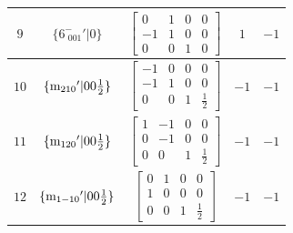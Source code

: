 \documentclass[fleqn,8pt]{jsarticle}
\begin{document}
\begin{longtable}{ccccc}
$ 9 $ & $ \{6^{-}_{\,\,001}{}'|0\} $ & $ \begin{bmatrix} 0 & 1 & 0 & 0 \\ -1 & 1 & 0 & 0 \\ 0 & 0 & 1 & 0 \end{bmatrix} $ & $ 1 $ & $ -1 $ \\ \hline
$ 10 $ & $ \{{\rm m}_{210}{}'|0 0 \frac{1}{2}\} $ & $ \begin{bmatrix} -1 & 0 & 0 & 0 \\ -1 & 1 & 0 & 0 \\ 0 & 0 & 1 & \frac{1}{2} \end{bmatrix} $ & $ -1 $ & $ -1 $ \\ \hline
$ 11 $ & $ \{{\rm m}_{120}{}'|0 0 \frac{1}{2}\} $ & $ \begin{bmatrix} 1 & -1 & 0 & 0 \\ 0 & -1 & 0 & 0 \\ 0 & 0 & 1 & \frac{1}{2} \end{bmatrix} $ & $ -1 $ & $ -1 $ \\ \hline
$ 12 $ & $ \{{\rm m}_{1-10}{}'|0 0 \frac{1}{2}\} $ & $ \begin{bmatrix} 0 & 1 & 0 & 0 \\ 1 & 0 & 0 & 0 \\ 0 & 0 & 1 & \frac{1}{2} \end{bmatrix} $ & $ -1 $ & $ -1 $ \\
\end{longtable}
\end{document}
